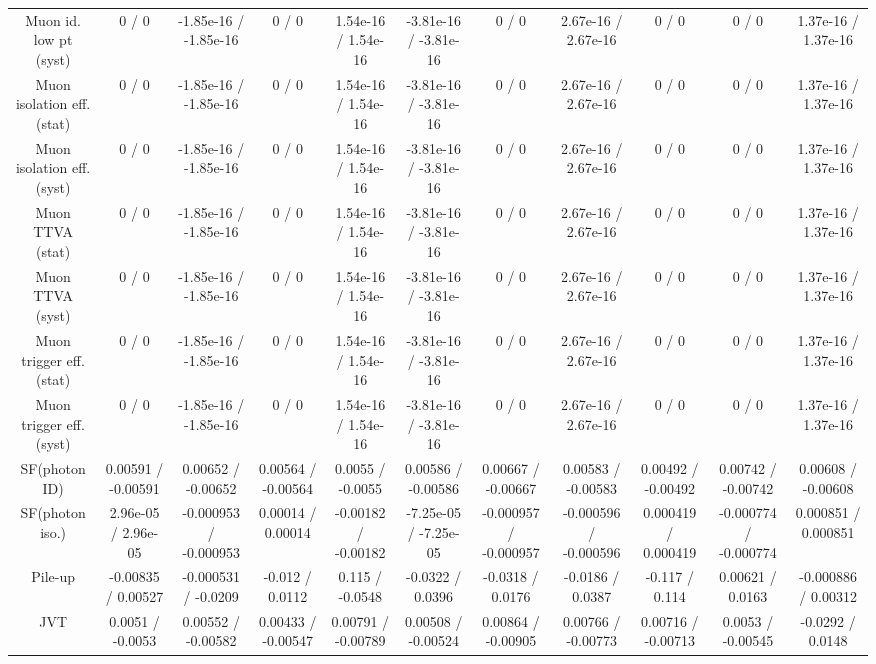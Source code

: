 \begin{table}[htbp]
\begin{center}
\begin{tabular}{|c|c|c|c|c|c|c|c|c|c|c|}
  Muon id. low pt (syst) & 0 / 0 & -1.85e-16 / -1.85e-16 & 0 / 0 & 1.54e-16 / 1.54e-16 & -3.81e-16 / -3.81e-16 & 0 / 0 & 2.67e-16 / 2.67e-16 & 0 / 0 & 0 / 0 & 1.37e-16 / 1.37e-16 \\ 
  Muon isolation eff. (stat) & 0 / 0 & -1.85e-16 / -1.85e-16 & 0 / 0 & 1.54e-16 / 1.54e-16 & -3.81e-16 / -3.81e-16 & 0 / 0 & 2.67e-16 / 2.67e-16 & 0 / 0 & 0 / 0 & 1.37e-16 / 1.37e-16 \\ 
  Muon isolation eff. (syst) & 0 / 0 & -1.85e-16 / -1.85e-16 & 0 / 0 & 1.54e-16 / 1.54e-16 & -3.81e-16 / -3.81e-16 & 0 / 0 & 2.67e-16 / 2.67e-16 & 0 / 0 & 0 / 0 & 1.37e-16 / 1.37e-16 \\ 
  Muon TTVA (stat) & 0 / 0 & -1.85e-16 / -1.85e-16 & 0 / 0 & 1.54e-16 / 1.54e-16 & -3.81e-16 / -3.81e-16 & 0 / 0 & 2.67e-16 / 2.67e-16 & 0 / 0 & 0 / 0 & 1.37e-16 / 1.37e-16 \\ 
  Muon TTVA (syst) & 0 / 0 & -1.85e-16 / -1.85e-16 & 0 / 0 & 1.54e-16 / 1.54e-16 & -3.81e-16 / -3.81e-16 & 0 / 0 & 2.67e-16 / 2.67e-16 & 0 / 0 & 0 / 0 & 1.37e-16 / 1.37e-16 \\ 
  Muon trigger eff. (stat) & 0 / 0 & -1.85e-16 / -1.85e-16 & 0 / 0 & 1.54e-16 / 1.54e-16 & -3.81e-16 / -3.81e-16 & 0 / 0 & 2.67e-16 / 2.67e-16 & 0 / 0 & 0 / 0 & 1.37e-16 / 1.37e-16 \\ 
  Muon trigger eff. (syst) & 0 / 0 & -1.85e-16 / -1.85e-16 & 0 / 0 & 1.54e-16 / 1.54e-16 & -3.81e-16 / -3.81e-16 & 0 / 0 & 2.67e-16 / 2.67e-16 & 0 / 0 & 0 / 0 & 1.37e-16 / 1.37e-16 \\ 
  SF(photon ID) & 0.00591 / -0.00591 & 0.00652 / -0.00652 & 0.00564 / -0.00564 & 0.0055 / -0.0055 & 0.00586 / -0.00586 & 0.00667 / -0.00667 & 0.00583 / -0.00583 & 0.00492 / -0.00492 & 0.00742 / -0.00742 & 0.00608 / -0.00608 \\ 
  SF(photon iso.) & 2.96e-05 / 2.96e-05 & -0.000953 / -0.000953 & 0.00014 / 0.00014 & -0.00182 / -0.00182 & -7.25e-05 / -7.25e-05 & -0.000957 / -0.000957 & -0.000596 / -0.000596 & 0.000419 / 0.000419 & -0.000774 / -0.000774 & 0.000851 / 0.000851 \\ 
  Pile-up & -0.00835 / 0.00527 & -0.000531 / -0.0209 & -0.012 / 0.0112 & 0.115 / -0.0548 & -0.0322 / 0.0396 & -0.0318 / 0.0176 & -0.0186 / 0.0387 & -0.117 / 0.114 & 0.00621 / 0.0163 & -0.000886 / 0.00312 \\ 
  JVT & 0.0051 / -0.0053 & 0.00552 / -0.00582 & 0.00433 / -0.00547 & 0.00791 / -0.00789 & 0.00508 / -0.00524 & 0.00864 / -0.00905 & 0.00766 / -0.00773 & 0.00716 / -0.00713 & 0.0053 / -0.00545 & -0.0292 / 0.0148 \\ 

\end{tabular}
\end{center}
\end{table}
